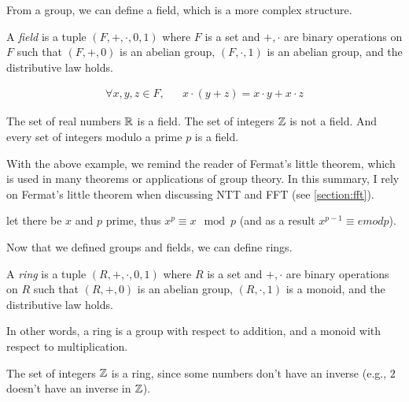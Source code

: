 From a group, we can define a field, which is a more complex structure.

\begin{defn}
    A \emph{field} is a tuple $(F,+,\cdot,0,1)$ where $F$ is a set and $+,\cdot$ are binary operations on $F$
    such that $(F,+,0)$ is an abelian group, $(F,\cdot,1)$ is an abelian group, and the distributive law holds.

    \begin{align*}
        \forall x,y,z\in F, && x\cdot(y+z) = x\cdot y + x\cdot z
    \end{align*}
\end{defn}


\begin{example}
    The set of real numbers $\mathbb{R}$ is a field. 
    The set of integers $\mathbb{Z}$ is not a field.
    And every set of integers modulo a prime $p$ is a field.
\end{example}

With the above example, we remind the reader of Fermat's little theorem, which 
is used in many theorems or applications of group theory. In this summary, I rely on Fermat's little theorem
when discussing NTT and FFT (see \autoref{section:fft}).

\begin{thm}\label{fermats-little-theorem}
    let there be $x$ and $p$ prime, thus $x^p \equiv x \mod p$
    (and as a result $x^{p-1}\equiv e mod p$).
\end{thm}


Now that we defined groups and fields, we can define rings.
\begin{defn}
    A \emph{ring} is a tuple $(R,+,\cdot,0,1)$ where $R$ is a set and $+,\cdot$ are binary operations on $R$
    such that $(R,+,0)$ is an abelian group, $(R,\cdot,1)$ is a monoid, and the distributive law holds.

\end{defn}

In other words, a ring is a group with respect to addition, and a monoid with respect to multiplication.

\begin{example}
    The set of integers $\mathbb{Z}$ is a ring, since some numbers don't 
    have an inverse (e.g., $2$ doesn't have an inverse in $\mathbb{Z}$). 
\end{example}



